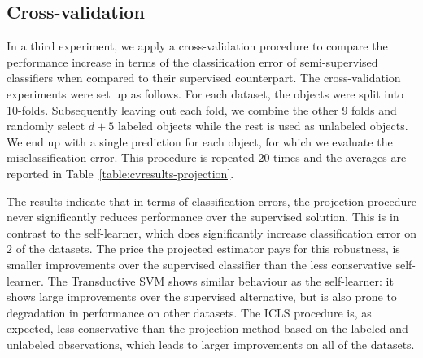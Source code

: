 \documentclass[twoside]{memoir}\usepackage[]{graphicx}\usepackage{xcolor}
\begin{document}
\subsection{Cross-validation}
In a third experiment, we apply a cross-validation procedure to compare the performance increase in terms of the classification error of semi-supervised classifiers when compared to their supervised counterpart. The cross-validation experiments were set up as follows. For each dataset, the objects were split into 10-folds. Subsequently leaving out each fold, we combine the other 9 folds and randomly select $d+5$ labeled objects while the rest is used as unlabeled objects. We end up with a single prediction for each object, for which we evaluate the misclassification error. This procedure is repeated $20$ times and the averages are reported in Table~\ref{table:cvresults-projection}.

The results indicate that in terms of classification errors, the projection procedure never significantly reduces performance over the supervised solution. This is in contrast to the self-learner, which does significantly increase classification error on $2$ of the datasets. The price the projected estimator pays for this robustness, is smaller improvements over the supervised classifier than the less conservative self-learner. The Transductive SVM shows similar behaviour as the self-learner: it shows large improvements over the supervised alternative, but is also prone to degradation in performance on other datasets. The ICLS procedure is, as expected, less conservative than the projection method based on the labeled and unlabeled observations, which leads to larger improvements on all of the datasets.
\end{document}

